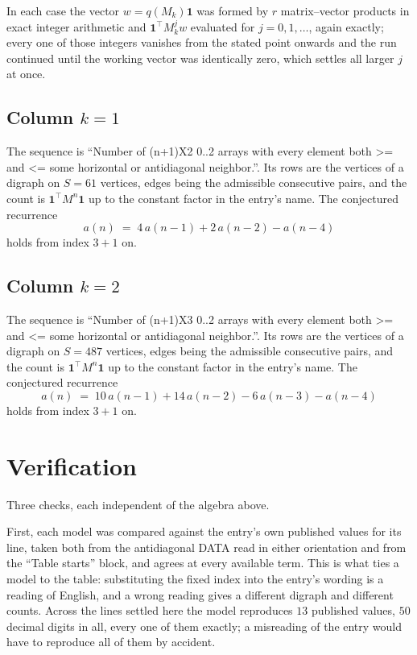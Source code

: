 \documentclass[11pt,a4paper]{article}
\theoremstyle{plain}
\theoremstyle{definition}
\begin{document}
In each case the vector $w=q(M_k)\mathbf{1}$ was formed by $r$ matrix--vector products in
exact integer arithmetic and $\mathbf{1}^{\!\top}M_k^{j}w$ evaluated for $j=0,1,\dots$,
again exactly; every one of those integers vanishes from the stated point onwards and the run
continued until the working vector was identically zero, which settles all larger $j$ at once.

\subsection*{Column $k$$=1$}
The sequence is ``Number of (n+1)X2 0..2 arrays with every element both >= and <= some horizontal or antidiagonal neighbor.''. Its rows are the vertices of a digraph on
$S=61$ vertices, edges being the admissible consecutive pairs, and the count is
$\mathbf{1}^{\!\top}M^{n}\mathbf{1}$ up to the constant factor in the entry's name.
The conjectured recurrence
\[
a(n)\;=\;4\,a(n-1) + 2\,a(n-2) - a(n-4)
\]
holds from index $3+1$ on.

\subsection*{Column $k$$=2$}
The sequence is ``Number of (n+1)X3 0..2 arrays with every element both >= and <= some horizontal or antidiagonal neighbor.''. Its rows are the vertices of a digraph on
$S=487$ vertices, edges being the admissible consecutive pairs, and the count is
$\mathbf{1}^{\!\top}M^{n}\mathbf{1}$ up to the constant factor in the entry's name.
The conjectured recurrence
\[
a(n)\;=\;10\,a(n-1) + 14\,a(n-2) - 6\,a(n-3) - a(n-4)
\]
holds from index $3+1$ on.

\section{Verification}

Three checks, each independent of the algebra above.

First, each model was compared against the entry's own published values for its line, taken
both from the antidiagonal DATA read in either orientation and from the ``Table starts''
block, and agrees at every available term. This is what ties a model to the table:
substituting the fixed index into the entry's wording is a reading of English, and a wrong
reading gives a different digraph and different counts. Across the lines settled here the
model reproduces $13$ published values, $50$ decimal digits in all, every one of
them exactly; a misreading of the entry would have to reproduce all of them by accident.
\end{document}
